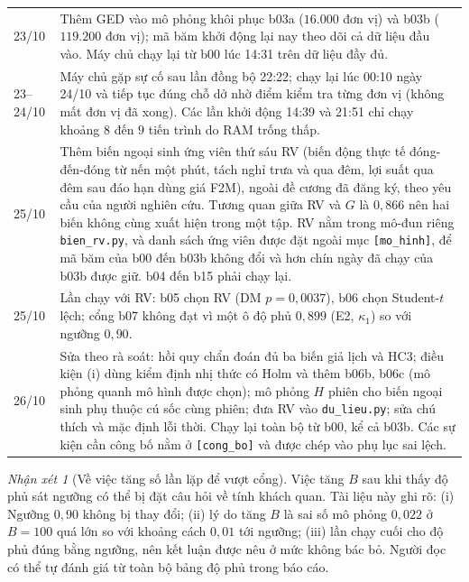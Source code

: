 \documentclass[12pt,a4paper]{article}
\theoremstyle{remark}
\newtheorem{nhanxet}{Nhận xét}[section]
\newcommand{\ma}[1]{\texttt{\small #1}}
\begin{document}
\begin{table}[h]
\begin{tabular}{@{}lp{12.6cm}@{}}
23/10 & Thêm GED vào mô phỏng khôi phục b03a ($16.000$ đơn vị) và b03b ($119.200$ đơn vị); mã băm khởi động lại nay theo dõi cả dữ liệu đầu vào. Máy chủ chạy lại từ b00 lúc 14:31 trên dữ liệu đầy đủ. \\
23--24/10 & Máy chủ gặp sự cố sau lần đồng bộ 22:22; chạy lại lúc 00:10 ngày 24/10 và tiếp tục đúng chỗ dở nhờ điểm kiểm tra từng đơn vị (không mất đơn vị đã xong). Các lần khởi động 14:39 và 21:51 chỉ chạy khoảng $8$ đến $9$ tiến trình do RAM trống thấp. \\
25/10 & Thêm biến ngoại sinh ứng viên thứ sáu RV (biến động thực tế đóng-đến-đóng từ nến một phút, tách nghỉ trưa và qua đêm, lợi suất qua đêm sau đáo hạn dùng giá F2M), ngoài đề cương đã đăng ký, theo yêu cầu của người nghiên cứu. Tương quan giữa RV và $G$ là $0{,}866$ nên hai biến không cùng xuất hiện trong một tập. RV nằm trong mô-đun riêng \ma{bien\_rv.py}, và danh sách ứng viên được đặt ngoài mục \ma{[mo\_hinh]}, để mã băm của b00 đến b03b không đổi và hơn chín ngày đã chạy của b03b được giữ. b04 đến b15 phải chạy lại. \\
25/10 & Lần chạy với RV: b05 chọn RV (DM $p=0{,}0037$), b06 chọn Student-$t$ lệch; cổng b07 không đạt vì một ô độ phủ $0{,}899$ (E2, $\kappa_1$) so với ngưỡng $0{,}90$. \\
26/10 & Sửa theo rà soát: hồi quy chẩn đoán đủ ba biến giả lịch và HC3; điều kiện (i) dùng kiểm định nhị thức có Holm và thêm b06b, b06c (mô phỏng quanh mô hình được chọn); mô phỏng $H$ phiên cho biến ngoại sinh phụ thuộc cú sốc cùng phiên; đưa RV vào \ma{du\_lieu.py}; sửa chú thích và mặc định lỗi thời. Chạy lại toàn bộ từ b00, kể cả b03b. Các sự kiện cần công bố nằm ở \ma{[cong\_bo]} và được chép vào phụ lục sai lệch. \\
\bottomrule
\end{tabular}
\end{table}

\begin{nhanxet}[Về việc tăng số lần lặp để vượt cổng]
Việc tăng $B$ sau khi thấy độ phủ sát ngưỡng có thể bị đặt câu hỏi về tính khách quan. Tài liệu này ghi rõ: (i) Ngưỡng $0{,}90$ không bị thay đổi; (ii) lý do tăng $B$ là sai số mô phỏng $0{,}022$ ở $B=100$ quá lớn so với khoảng cách $0{,}01$ tới ngưỡng; (iii) lần chạy cuối cho độ phủ đúng bằng ngưỡng, nên kết luận được nêu ở mức không bác bỏ. Người đọc có thể tự đánh giá từ toàn bộ bảng độ phủ trong báo cáo.
\end{nhanxet}

\end{document}
